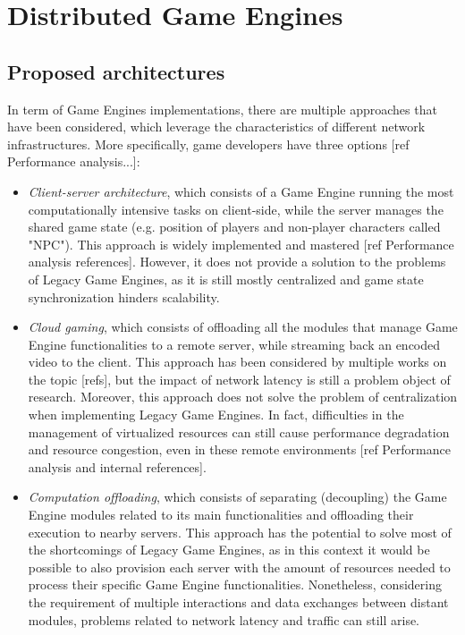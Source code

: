 \section{Distributed Game Engines}

\subsection{Proposed architectures}
In term of Game Engines implementations, there are multiple approaches that have been considered, which leverage the characteristics of different network infrastructures. More specifically, game developers have three options [ref Performance analysis...]:
\begin{itemize}
	\item \textit{Client-server architecture}, which consists of a Game Engine running the most computationally intensive tasks on client-side, while the server manages the shared game state (e.g. position of players and non-player characters called "NPC"). This approach is widely implemented and mastered [ref Performance analysis references]. However, it does not provide a solution to the problems of Legacy Game Engines, as it is still mostly centralized and game state synchronization hinders scalability.
	\item \textit{Cloud gaming}, which consists of offloading all the modules that manage Game Engine functionalities to a remote server, while streaming back an encoded video to the client. This approach has been considered by multiple works on the topic [refs], but the impact of network latency is still a problem object of research. Moreover, this approach does not solve the problem of centralization when implementing Legacy Game Engines. In fact, difficulties in the management of virtualized resources  can still cause performance degradation and resource congestion, even in these remote environments [ref Performance analysis and internal references].
	\item \textit{Computation offloading}, which consists of separating (decoupling) the Game Engine modules related to its main functionalities and offloading their execution to nearby servers. This approach has the potential to solve most of the shortcomings of Legacy Game Engines, as in this context it would be possible to also provision each server with the amount of resources needed to process their specific Game Engine functionalities. Nonetheless, considering the requirement of multiple interactions and data exchanges between distant modules, problems related to network latency and traffic can still arise.
\end{itemize}
